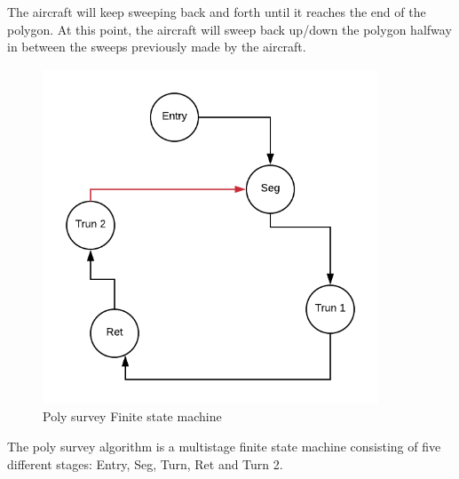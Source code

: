 The aircraft will keep sweeping back and forth until it reaches the end of the polygon. At this point, the aircraft will sweep back up/down the polygon halfway in between the sweeps previously made by the aircraft. 
\begin{figure}[H]
\centering
\includegraphics[width=10cm,height=10cm,keepaspectratio]{imagenes/FSM.png}
\caption{Poly survey Finite state machine }
\label{fig:fixed-wing_UAS}
\end{figure}

The poly survey algorithm is a multistage finite state machine consisting of five different stages: Entry, Seg, Turn, Ret and Turn 2.
